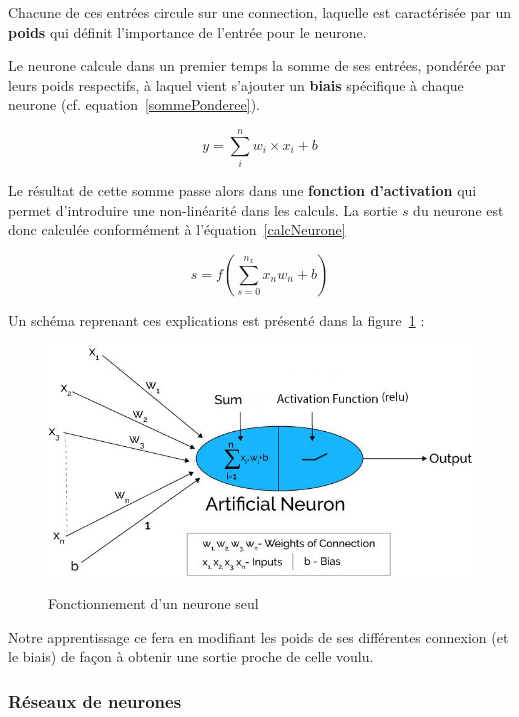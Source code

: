 Chacune de ces entrées circule sur une connection, laquelle est caractérisée par un \textbf{poids} qui définit l'importance de l'entrée pour le neurone.

Le neurone calcule dans un premier temps la somme de ses entrées, pondérée par leurs poids respectifs, à laquel vient s'ajouter un \textbf{biais} spécifique à chaque neurone (cf. equation~\ref{sommePonderee}).

\begin{equation}
\label{sommePonderee}
y = \sum_{i}^{n} w_i \times x_i + b
\end{equation}

Le résultat de cette somme passe alors dans une \textbf{fonction d'activation} qui permet d'introduire une non-linéarité dans les calculs. La sortie $s$ du neurone est donc calculée conformément à l'équation~\ref{calcNeurone}

\begin{equation}
\label{calcNeurone}
s = f(\sum_{s=0}^{n_{x}} x_{n}w_{n} + b)
\end{equation}

Un schéma reprenant ces explications est présenté dans la figure~\ref{neuroneSeul} :

\begin{figure}[h]
\includegraphics[width=16.5cm]{./images/image2.jpg}
\label{neuroneSeul}
\caption{Fonctionnement d'un neurone seul}
\end{figure}

Notre apprentissage ce fera en modifiant les poids de ses différentes
connexion (et le biais) de façon à obtenir une sortie proche de celle voulu.\newline

\subsubsection{Réseaux de neurones}
\label{Réseaux de neurones}

